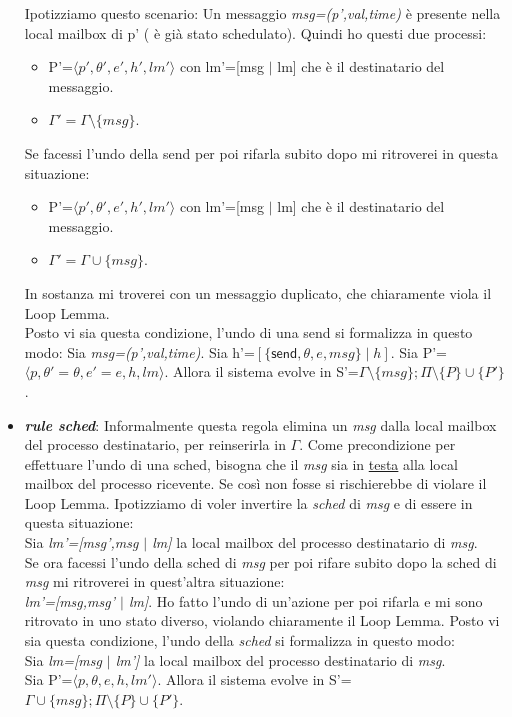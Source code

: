 \documentclass[background.tex]{subfiles}
\begin{document}
\begin{itemize}
		Ipotizziamo questo scenario:
		Un messaggio \textit{msg=(p',val,time)} è presente nella local mailbox di p' ( è già stato schedulato). Quindi ho questi due processi:
			\begin{itemize}
				\item P'=$\displaystyle \langle p',\theta',e',h',lm'\rangle$ con lm'=[msg  $\mid$ lm] che è il destinatario del messaggio.
				\item $\displaystyle \Gamma'=\Gamma\setminus\{msg\}$.
			\end{itemize}
		Se facessi l'undo della send per poi rifarla subito dopo mi ritroverei in questa situazione:
			\begin{itemize}
				\item P'=$\displaystyle \langle p',\theta',e',h',lm'\rangle$ con lm'=[msg  $\mid$ lm] che è il destinatario del messaggio.
				\item $\displaystyle \Gamma'=\Gamma\cup\{msg\}$.
			\end{itemize}
		In sostanza mi troverei con un messaggio duplicato, che chiaramente viola il Loop Lemma.\\
		Posto vi sia questa condizione, l'undo di una send si formalizza in questo modo:
		Sia \textit{msg=(p',val,time)}.
		Sia h'=$\displaystyle [\{\mathsf{send},\theta,e,msg\} \mid h]$.
		Sia P'=$\displaystyle \langle p,\theta'=\theta,e'=e,h,lm \rangle$.
		Allora il sistema evolve in S'=$\displaystyle \Gamma\setminus\{msg\};\Pi\setminus\{P\}\cup\{P'\}$.
		\item \textit{\textbf{rule sched}}: Informalmente questa regola elimina un \textit{msg} dalla local mailbox del processo destinatario, per reinserirla in $\Gamma$.
		Come precondizione per effettuare l'undo di una sched, bisogna che il \textit{msg} sia in \underline{testa} alla local mailbox del processo ricevente. Se così non fosse si rischierebbe di violare il Loop Lemma.
		Ipotizziamo di voler invertire la \textit{sched} di \textit{msg} e di essere in questa situazione:\\
		Sia \textit{lm'=[msg',msg $\mid$ lm]} la local mailbox del processo destinatario di \textit{msg}.\\
		Se ora facessi l'undo della sched di \textit{msg} per poi rifare subito dopo la sched di \textit{msg} mi ritroverei in quest'altra situazione:\\
		\textit{lm'=[msg,msg' $\mid$ lm]}.
		Ho fatto l'undo di un'azione per poi rifarla e mi sono ritrovato in uno stato diverso, violando chiaramente il Loop Lemma.
		Posto vi sia questa condizione, l'undo della \textit{sched} si formalizza in questo modo:\\
		Sia \textit{lm=[msg $\mid$ lm']} la local mailbox del processo destinatario di \textit{msg}.\\
		Sia P'=$\displaystyle \langle p,\theta,e,h,lm' \rangle$.
		Allora il sistema evolve in S'=$\displaystyle \Gamma\cup\{msg\};\Pi\setminus\{P\}\cup\{P'\}$.
	\end{itemize}
\end{document}
